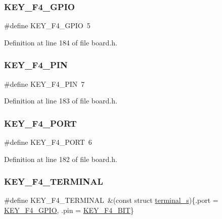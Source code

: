 \subsubsection{\texorpdfstring{K\+E\+Y\+\_\+\+F4\+\_\+\+G\+P\+IO}{KEY\_F4\_GPIO}}
{\footnotesize\ttfamily \#define K\+E\+Y\+\_\+\+F4\+\_\+\+G\+P\+IO~5}



Definition at line 184 of file board.\+h.

\mbox{\label{group__hal_ga0b7c8de71cb61c639769e5b3b8ba9603}} 
\subsubsection{\texorpdfstring{K\+E\+Y\+\_\+\+F4\+\_\+\+P\+IN}{KEY\_F4\_PIN}}
{\footnotesize\ttfamily \#define K\+E\+Y\+\_\+\+F4\+\_\+\+P\+IN~7}



Definition at line 183 of file board.\+h.

\mbox{\label{group__hal_gaeb2af3258e8481b8855ee6df928fdae4}} 
\subsubsection{\texorpdfstring{K\+E\+Y\+\_\+\+F4\+\_\+\+P\+O\+RT}{KEY\_F4\_PORT}}
{\footnotesize\ttfamily \#define K\+E\+Y\+\_\+\+F4\+\_\+\+P\+O\+RT~6}



Definition at line 182 of file board.\+h.

\mbox{\label{group__hal_ga88e24403963b95f3056acd51ba585d78}} 
\subsubsection{\texorpdfstring{K\+E\+Y\+\_\+\+F4\+\_\+\+T\+E\+R\+M\+I\+N\+AL}{KEY\_F4\_TERMINAL}}
{\footnotesize\ttfamily \#define K\+E\+Y\+\_\+\+F4\+\_\+\+T\+E\+R\+M\+I\+N\+AL~\&(const struct \hyperlink{structterminal__s}{terminal\+\_\+s})\{.port = \hyperlink{group__hal_gabc1b6065dd7a4f9e7c7eb492f7d3d548}{K\+E\+Y\+\_\+\+F4\+\_\+\+G\+P\+IO}, .pin = \hyperlink{group__hal_gadd1233da3fb79555176e60c1433f5d2c}{K\+E\+Y\+\_\+\+F4\+\_\+\+B\+IT}\}}



